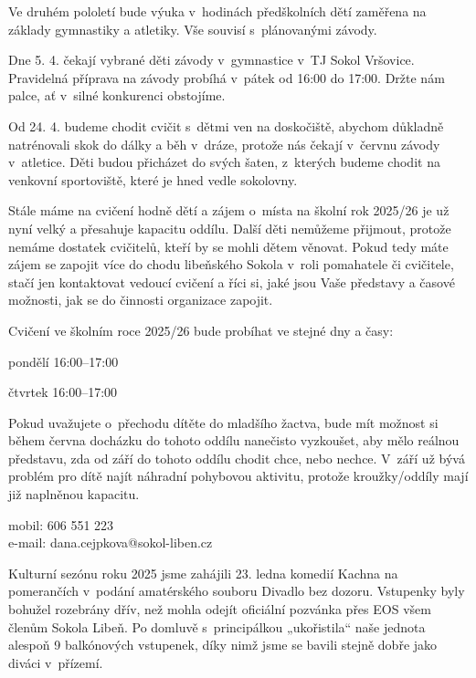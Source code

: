 \documentclass[11pt]{article}
\begin{document}
\vspace*{24pt}

Ve druhém pololetí bude výuka v~hodinách předškolních dětí zaměřena na základy gymnastiky a atletiky. Vše souvisí s~plánovanými závody.

Dne 5. 4. čekají vybrané děti závody v~gymnastice v~TJ Sokol Vršovice. Pravidelná příprava na závody probíhá v~pátek od 16:00 do 17:00. Držte nám palce, ať v~silné konkurenci obstojíme. 

Od 24. 4. budeme chodit cvičit s~dětmi ven na doskočiště, abychom důkladně natrénovali skok do dálky a běh v~dráze, protože nás čekají v~červnu závody v~atletice. Děti budou přicházet do svých šaten, z~kterých budeme chodit na venkovní sportoviště, které je hned vedle sokolovny.

Stále máme na cvičení hodně dětí a zájem o~místa na školní rok 2025/26 je už nyní velký a přesahuje kapacitu oddílu. Další děti nemůžeme přijmout, protože nemáme dostatek cvičitelů, kteří by se mohli dětem věnovat. Pokud tedy máte zájem se zapojit více do chodu libeňského Sokola v~roli pomahatele či cvičitele, stačí jen kontaktovat vedoucí cvičení a říci si, jaké jsou Vaše představy a časové možnosti, jak se do činnosti organizace zapojit.

\noindent Cvičení ve školním roce 2025/26 bude probíhat ve stejné dny a časy:

pondělí 16:00–17:00

čtvrtek 16:00–17:00

Pokud uvažujete o~přechodu dítěte do mladšího žactva, bude mít možnost si během června docházku do tohoto oddílu nanečisto vyzkoušet, aby mělo reálnou představu, zda od září do tohoto oddílu chodit chce, nebo nechce. V~září už bývá problém pro dítě najít náhradní pohybovou aktivitu, protože kroužky/oddíly mají již naplněnou kapacitu.

\signature{Dana Cejpková}{mobil: 606 551 223\\e-mail: dana.cejpkova@sokol-liben.cz}

\vspace*{24pt}

Kulturní sezónu roku 2025 jsme zahájili 23. ledna komedií Kachna na pomerančích v~podání amatérského souboru Divadlo bez dozoru. Vstupenky byly bohužel rozebrány dřív, než mohla odejít oficiální pozvánka přes EOS všem členům Sokola Libeň. Po domluvě s~principálkou „ukořistila“ naše jednota alespoň 9 balkónových vstupenek, díky nimž jsme se bavili stejně dobře jako diváci v~přízemí.
\end{document}
